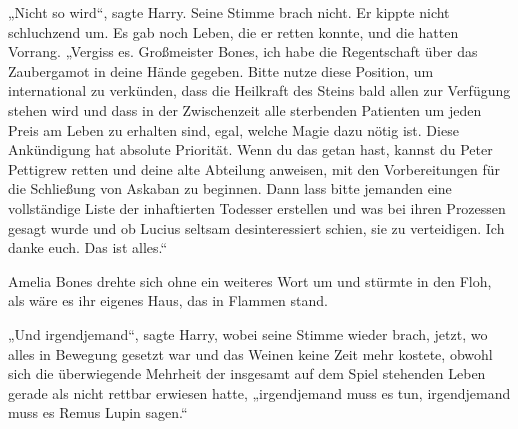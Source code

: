 „Nicht so wird“, sagte Harry. Seine Stimme brach nicht. Er kippte nicht schluchzend um.
Es gab noch Leben, die er retten konnte, und die hatten Vorrang. „Vergiss es. Großmeister Bones, ich habe die Regentschaft über das Zaubergamot in deine Hände gegeben. Bitte nutze diese Position, um international zu verkünden, dass die Heilkraft des Steins bald allen zur Verfügung stehen wird und dass in der Zwischenzeit alle sterbenden Patienten um jeden Preis am Leben zu erhalten sind, egal, welche Magie dazu nötig ist. Diese Ankündigung hat absolute Priorität. Wenn du das getan hast, kannst du Peter Pettigrew retten und deine alte Abteilung anweisen, mit den Vorbereitungen für die Schließung von Askaban zu beginnen. Dann lass bitte jemanden eine vollständige Liste der inhaftierten Todesser erstellen und was bei ihren Prozessen gesagt wurde und ob Lucius seltsam desinteressiert schien, sie zu verteidigen. Ich danke euch. Das ist alles.“

Amelia Bones drehte sich ohne ein weiteres Wort um und stürmte in den Floh, als wäre es ihr eigenes Haus, das in Flammen stand.

„Und irgendjemand“, sagte Harry, wobei seine Stimme wieder brach, jetzt, wo alles in Bewegung gesetzt war und das Weinen keine Zeit mehr kostete, obwohl sich die überwiegende Mehrheit der insgesamt auf dem Spiel stehenden Leben gerade als nicht rettbar erwiesen hatte, „irgendjemand muss es tun, irgendjemand muss es Remus Lupin sagen.“

